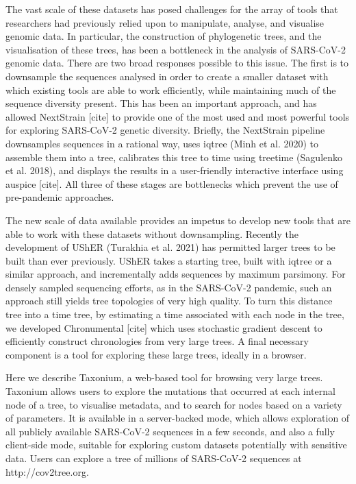 The vast scale of these datasets has posed challenges for the array of tools that researchers had previously relied upon to manipulate, analyse, and visualise genomic data. In particular, the construction of phylogenetic trees, and the visualisation of these trees, has been a bottleneck in the analysis of SARS-CoV-2 genomic data. There are two broad responses possible to this issue. The first is to downsample the sequences analysed in order to create a smaller dataset with which existing tools are able to work efficiently, while maintaining much of the sequence diversity present. This has been an important approach, and has allowed NextStrain [cite] to provide one of the most used and most powerful tools for exploring SARS-CoV-2 genetic diversity. Briefly, the NextStrain pipeline downsamples sequences in a rational way, uses iqtree (Minh et al. 2020) to assemble them into a tree, calibrates this tree to time using treetime (Sagulenko et al. 2018), and displays the results in a user-friendly interactive interface using auspice [cite]. All three of these stages are bottlenecks which prevent the use of pre-pandemic approaches.

The new scale of data available provides an impetus to develop new tools that are able to work with these datasets without downsampling. Recently the development of UShER (Turakhia et al. 2021) has permitted larger trees to be built than ever previously. UShER takes a starting tree, built with iqtree or a similar approach, and incrementally adds sequences by maximum parsimony. For densely sampled sequencing efforts, as in the SARS-CoV-2 pandemic, such an approach still yields tree topologies of very high quality. To turn this distance tree into a time tree, by estimating a time associated with each node in the tree, we developed Chronumental [cite] which uses stochastic gradient descent to efficiently construct chronologies from very large trees. A final necessary component is a tool for exploring these large trees, ideally in a browser.

Here we describe Taxonium, a web-based tool for browsing very large trees. Taxonium allows users to explore the mutations that occurred at each internal node of a tree, to visualise metadata, and to search for nodes based on a variety of parameters. It is available in a server-backed mode, which allows exploration of all publicly available SARS-CoV-2 sequences in a few seconds, and also a fully client-side mode, suitable for exploring custom datasets potentially with sensitive data. Users can explore a tree of millions of SARS-CoV-2 sequences at http://cov2tree.org.


